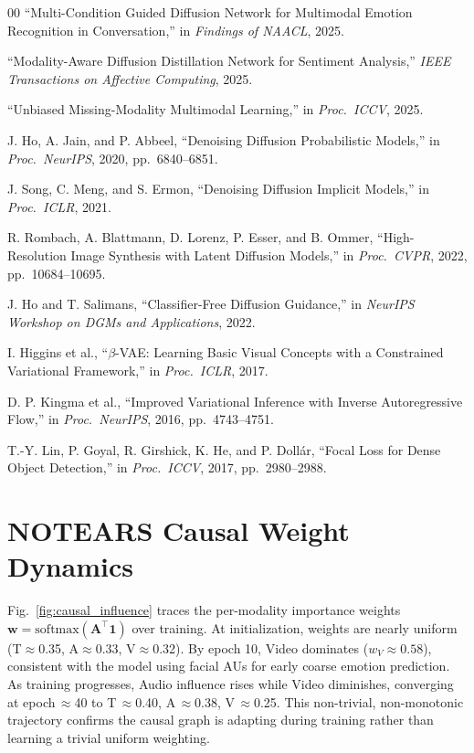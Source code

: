 \documentclass[conference]{IEEEtran}
\begin{document}
\begin{thebibliography}{00}
``Multi-Condition Guided Diffusion Network for Multimodal Emotion Recognition
in Conversation,'' in \textit{Findings of NAACL}, 2025.

``Modality-Aware Diffusion Distillation Network for Sentiment Analysis,''
\textit{IEEE Transactions on Affective Computing}, 2025.

``Unbiased Missing-Modality Multimodal Learning,'' in \textit{Proc.\ ICCV},
2025.

J. Ho, A. Jain, and P. Abbeel, ``Denoising Diffusion Probabilistic Models,''
in \textit{Proc.\ NeurIPS}, 2020, pp.~6840--6851.

J. Song, C. Meng, and S. Ermon, ``Denoising Diffusion Implicit Models,''
in \textit{Proc.\ ICLR}, 2021.

R. Rombach, A. Blattmann, D. Lorenz, P. Esser, and B. Ommer,
``High-Resolution Image Synthesis with Latent Diffusion Models,''
in \textit{Proc.\ CVPR}, 2022, pp.~10684--10695.

J. Ho and T. Salimans, ``Classifier-Free Diffusion Guidance,''
in \textit{NeurIPS Workshop on DGMs and Applications}, 2022.

I. Higgins et al., ``$\beta$-VAE: Learning Basic Visual Concepts with a
Constrained Variational Framework,'' in \textit{Proc.\ ICLR}, 2017.

D. P. Kingma et al., ``Improved Variational Inference with Inverse
Autoregressive Flow,'' in \textit{Proc.\ NeurIPS}, 2016, pp.~4743--4751.

T.-Y. Lin, P. Goyal, R. Girshick, K. He, and P. Doll\'ar, ``Focal Loss for
Dense Object Detection,'' in \textit{Proc.\ ICCV}, 2017, pp.~2980--2988.

\end{thebibliography}

\appendix

\section{NOTEARS Causal Weight Dynamics}
\label{app:causal}

Fig.~\ref{fig:causal_influence} traces the per-modality importance weights
$\mathbf{w} = \mathrm{softmax}(\mathbf{A}^\top\mathbf{1})$ over training.
At initialization, weights are nearly uniform (T$\approx$0.35, A$\approx$0.33,
V$\approx$0.32).  By epoch 10, Video dominates ($w_V \approx 0.58$), consistent
with the model using facial AUs for early coarse emotion prediction.  As training
progresses, Audio influence rises while Video diminishes, converging at
epoch\,$\approx$40 to T\,$\approx$0.40, A\,$\approx$0.38, V\,$\approx$0.25.
This non-trivial, non-monotonic trajectory confirms the causal graph is adapting
during training rather than learning a trivial uniform weighting.
\end{document}
